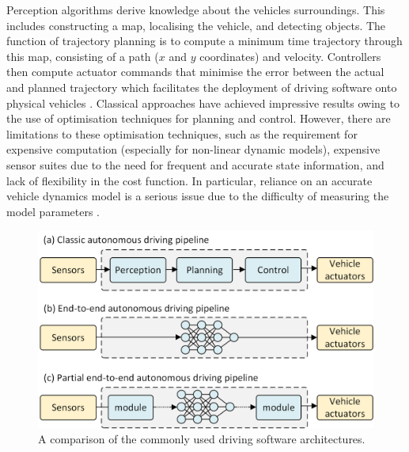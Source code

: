 Perception algorithms derive knowledge about the vehicles surroundings. 
This includes constructing a map, localising the vehicle, and detecting objects. 
The function of trajectory planning is to compute a minimum time trajectory through this map, consisting of a path ($x$ and $y$ coordinates) and velocity. Controllers then compute actuator commands that minimise the error between the actual and planned trajectory which facilitates the deployment of driving software onto physical vehicles \cite{Betz2021}. 
Classical approaches have achieved impressive results owing to the use of optimisation techniques for planning and control. 
However, there are limitations to these optimisation techniques, such as the requirement for expensive computation (especially for non-linear dynamic models), expensive sensor suites due to the need for frequent and accurate state information, and lack of flexibility in the cost function. 
In particular, reliance on an accurate vehicle dynamics model is a serious issue due to the difficulty of measuring the model parameters \cite{Kabzan2019, Pan2017}.

\begin{figure}[!htb]
\centering
\includegraphics[width=\textwidth*8/10]{contents/chapt1/figs/architecture_comparisons.png}
\caption[A comparison of the commonly used driving software architectures]{A comparison of the commonly used driving software architectures.}
\label{fig:architecture_comparison}
\end{figure}

